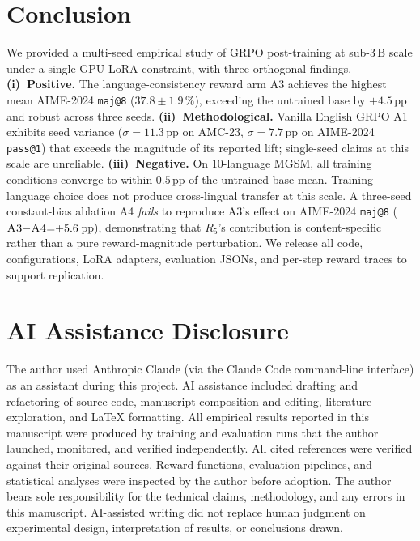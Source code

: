 \documentclass[11pt]{article}
\newcommand{\armA}{\textsc{A1}}
\newcommand{\armC}{\textsc{A3}}
\newcommand{\armD}{\textsc{A4}}
\newcommand{\R}[1]{R_{#1}}
\begin{document}
\section{Conclusion}
\label{sec:conclusion}
We provided a multi-seed empirical study of GRPO post-training at
sub-3\,B scale under a single-GPU LoRA constraint, with three
orthogonal findings.
\textbf{(i)~Positive.} The language-consistency reward arm \armC{}
achieves the highest mean AIME-2024 \texttt{maj@8} ($37.8 \pm 1.9$\,\%),
exceeding the untrained base by $+4.5$\,pp and robust across three
seeds.
\textbf{(ii)~Methodological.} Vanilla English GRPO \armA{} exhibits seed
variance ($\sigma{=}11.3$\,pp on AMC-23, $\sigma{=}7.7$\,pp on
AIME-2024 \texttt{pass@1}) that exceeds the magnitude of its reported
lift; single-seed claims at this scale are unreliable.
\textbf{(iii)~Negative.} On 10-language MGSM, all training conditions
converge to within $0.5$\,pp of the untrained base mean.
Training-language choice does not produce cross-lingual transfer at
this scale.
A three-seed constant-bias ablation \armD{} \emph{fails} to reproduce
\armC{}'s effect on AIME-2024 \texttt{maj@8}
($\armC{}{-}\armD{}{=}{+}5.6$\,pp), demonstrating that $\R{5}$'s
contribution is content-specific rather than a pure reward-magnitude
perturbation. We release all code, configurations, LoRA adapters,
evaluation JSONs, and per-step reward traces to support replication.

\section*{AI Assistance Disclosure}
\label{sec:ai_disclosure}
The author used Anthropic Claude (via the Claude Code command-line
interface) as an assistant during this project. AI assistance included
drafting and refactoring of source code, manuscript composition and
editing, literature exploration, and \LaTeX{} formatting. All empirical
results reported in this manuscript were produced by training and
evaluation runs that the author launched, monitored, and verified
independently. All cited references were verified against their
original sources. Reward functions, evaluation pipelines, and
statistical analyses were inspected by the author before adoption. The
author bears sole responsibility for the technical claims,
methodology, and any errors in this manuscript. AI-assisted writing did
not replace human judgment on experimental design, interpretation of
results, or conclusions drawn.



\appendix

\end{document}

